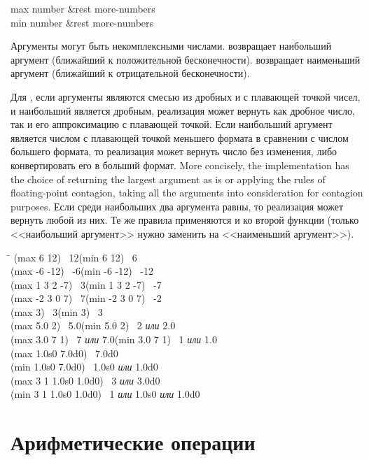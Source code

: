 \begin{defun}[Функция]
max number &rest more-numbers \\
min number &rest more-numbers

Аргументы могут быть некомплексными числами.
 возвращает наибольший аргумент (ближайший к положительной
бесконечности).
 возвращает наименьший аргумент (ближайший к отрицательной
бесконечности).

Для , если аргументы являются смесью из дробных и с плавающей точкой
чисел, и наибольший является дробным, реализация может вернуть как дробное
число, так и его аппроксимацию с плавающей точкой.
Если наибольший аргумент является числом с плавающей точкой меньшего формата в
сравнении с числом большего формата, то реализация может вернуть число без
изменения, либо конвертировать его в больший формат.
More concisely, the implementation has the choice of returning the largest
argument as is or applying the rules of floating-point contagion,
taking all the arguments into consideration for contagion purposes.
Если среди наибольших два аргумента равны, то реализация может вернуть любой из
них.
Те же правила применяются и ко второй функции  (только <<наибольший
аргумент>> нужно заменить на <<наименьший аргумент>>).

\begin{lisp}
\textwidth\=\kill
(max 6 12) \EV\ 12\>(min 6 12) \EV\ 6 \\
(max -6 -12) \EV\ -6\>(min -6 -12) \EV\ -12 \\
(max 1 3 2 -7) \EV\ 3\>(min 1 3 2 -7) \EV\ -7 \\
(max -2 3 0 7) \EV\ 7\>(min -2 3 0 7) \EV\ -2 \\
(max 3) \EV\ 3\>(min 3) \EV\ 3 \\
(max 5.0 2) \EV\ 5.0\>(min 5.0 2) \EV\ 2 \emph{или} 2.0 \\
(max 3.0 7 1) \EV\ 7 \emph{или} 7.0\>(min 3.0 7 1) \EV\ 1 \emph{или} 1.0 \\
(max 1.0s0 7.0d0) \EV\ 7.0d0 \\
(min 1.0s0 7.0d0) \EV\ 1.0s0 \emph{или} 1.0d0 \\
(max 3 1 1.0s0 1.0d0) \EV\ 3 \emph{или} 3.0d0 \\
(min 3 1 1.0s0 1.0d0) \EV\ 1 \emph{или} 1.0s0 \emph{или} 1.0d0
\end{lisp}
\end{defun}

\section{Арифметические операции}

